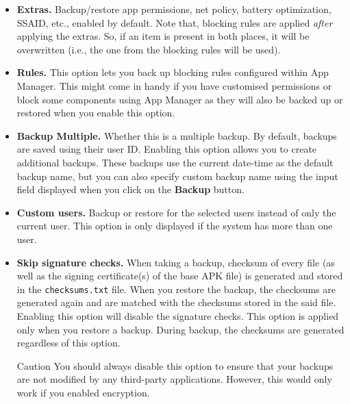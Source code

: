 \begin{itemize}
    \item \textbf{Extras.} Backup/restore app permissions, net policy, battery optimization, SSAID, etc., enabled by default.
    Note that, blocking rules are applied \textit{after} applying the extras.
    So, if an item is present in both places, it will be overwritten (i.e., the one from the blocking rules will be used).

    \item \textbf{Rules.} This option lets you back up blocking rules configured within App Manager.
    This might come in handy if you have customised permissions or block some components using App Manager as they will
    also be backed up or restored when you enable this option.

    \item \textbf{Backup Multiple.} Whether this is a multiple backup.
    By default, backups are saved using their user ID\@.
    Enabling this option allows you to create additional backups.
    These backups use the current date-time as the default backup name, but you can also specify custom backup name
    using the input field displayed when you click on the \textbf{Backup} button.

    \item \textbf{Custom users.} Backup or restore for the selected users instead of only the current user.
    This option is only displayed if the system has more than one user.

    \item \textbf{Skip signature checks.} When taking a backup, checksum of every file (as well as the signing
    certificate(s) of the base APK file) is generated and stored in the \texttt{checksums.txt} file.
    When you restore the backup, the checksums are generated again and are matched with the checksums stored in the said file.
    Enabling this option will disable the signature checks.
    This option is applied only when you restore a backup.
    During backup, the checksums are generated regardless of this option.
    \begin{warning}{Caution}
        You should always disable this option to ensure that your backups are not modified by any third-party applications.
        However, this would only work if you enabled encryption.
    \end{warning}
\end{itemize}


